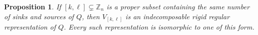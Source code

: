 \documentclass[12pt]{amsart}
\newcommand{\ZZ}{\mathbb{Z}}
\newtheorem{proposition}[theorem]{Proposition}
\theoremstyle{remark}
\numberwithin{equation}{section}
\numberwithin{figure}{section}
\begin{document}
\begin{proposition}
If $[k,\ell] \subsetneq \ZZ_n$ is a proper subset containing the same number of sinks and sources of $Q$, then $V_{[k,\ell]}$ is an indecomposable rigid regular representation of $Q$. Every such representation is isomorphic to one of this form. 
\end{proposition}
\end{document}
